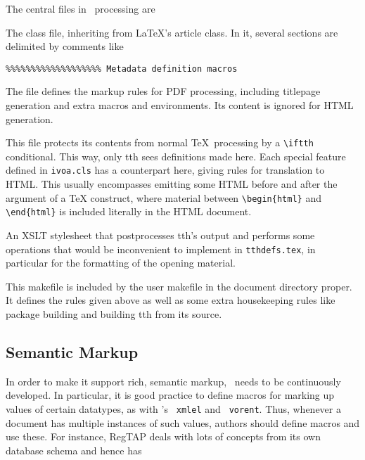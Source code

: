 \documentclass[11pt,a4paper]{ivoa}
\newcommand{\texword}[1]{\texttt{\color{texcolor} #1}}
\begin{document}
The central files in \ivoatex\ processing are

\begin{bigdescription}
\item[ivoa.cls] The class file, inheriting from \LaTeX's article class.
In it, several sections are delimited by comments like

\begin{lstlisting}
%%%%%%%%%%%%%%%%%%% Metadata definition macros
\end{lstlisting}

The file defines the markup rules for PDF processing, including
titlepage generation and extra macros and environments.  Its content is
ignored for HTML generation.

\item[tthdefs.tex] This file protects its contents from normal \TeX\
processing by a \verb|\iftth| conditional. This way, only tth sees
definitions made here. Each special feature defined in \texttt{ivoa.cls}
has a counterpart here, giving rules for translation to HTML.  This
usually encompasses emitting some HTML before and after the argument of
a TeX construct, where material between \verb|\begin{html}| and
\verb|\end{html}| is included literally in the HTML document.

\item[tth-ivoa.xslt] An XSLT stylesheet that postprocesses tth's output
and performs some operations that would be inconvenient to implement in
\texttt{tthdefs.tex}, in particular for the formatting of the opening
material.

\item[Makefile] This makefile is included by the user makefile in the
document directory proper.  It defines the rules given above as well as
some extra housekeeping rules like package building and building tth
from its source.

\end{bigdescription}

\subsection{Semantic Markup}

In order to make it support rich, semantic markup, \ivoatex\ needs to be
continuously developed.  In particular, it is good practice to define
macros for marking up values of certain datatypes, as with \ivoatex's
\texword{xmlel} and \texword{vorent}.  
Thus, whenever a document has multiple
instances of such values, authors should define macros and use these.
For instance, RegTAP deals with lots of concepts from its own
database schema and hence has
\end{document}
